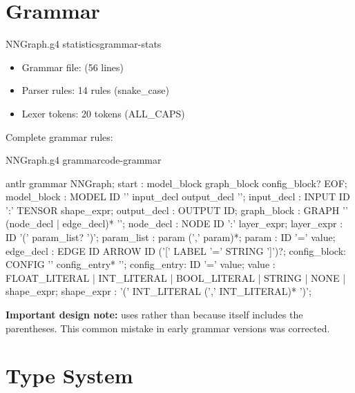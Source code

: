 \documentclass{nngraph-en}
\begin{document}
\section{Grammar}

\begin{dfnbox}{NNGraph.g4 statistics}{grammar-stats}
\begin{itemize}[noitemsep]
    \item Grammar file:  (56 lines)
    \item Parser rules: 14 rules (snake\_case)
    \item Lexer tokens: 20 tokens (ALL\_CAPS)
\end{itemize}
\end{dfnbox}

Complete grammar rules:

\begin{codebox}{NNGraph.g4 grammar}{code-grammar}
\begin{amzcode}{antlr}
grammar NNGraph;
start     : model_block graph_block config_block? EOF;
model_block : MODEL ID '{' input_decl output_decl '}';
input_decl  : INPUT ID ':' TENSOR shape_expr;
output_decl : OUTPUT ID;
graph_block : GRAPH '{' (node_decl | edge_decl)* '}';
node_decl   : NODE ID ':' layer_expr;
layer_expr  : ID '(' param_list? ')';
param_list  : param (',' param)*;
param       : ID '=' value;
edge_decl   : EDGE ID ARROW ID ('[' LABEL '=' STRING ']')?;
config_block: CONFIG '{' config_entry* '}';
config_entry: ID '=' value;
value       : FLOAT_LITERAL | INT_LITERAL | BOOL_LITERAL
            | STRING | NONE | shape_expr;
shape_expr  : '(' INT_LITERAL (',' INT_LITERAL)* ')';
\end{amzcode}
\end{codebox}

\begin{notebox}
\textbf{Important design note:}  uses
 rather than
 because 
itself includes the parentheses. This common mistake in early
grammar versions was corrected.
\end{notebox}

\section{Type System}
\end{document}
